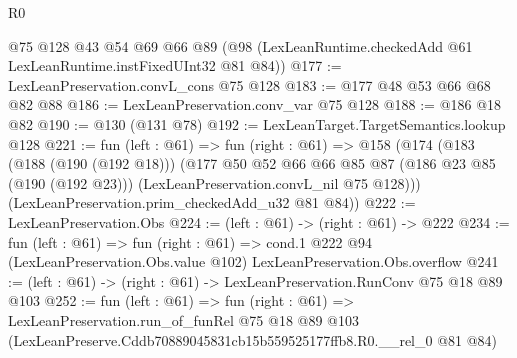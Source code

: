 \begin{lexlean}{R0}
\begin{coremodule}
    @75
    @128
    @43
    @54
    @69
    @66
    @89
    (@98 (LexLeanRuntime.checkedAdd @61 LexLeanRuntime.instFixedUInt32 @81 @84))
@177 := LexLeanPreservation.convL_cons @75 @128
@183 := @177 @48 @53 @66 @68 @82 @88
@186 := LexLeanPreservation.conv_var @75 @128
@188 := @186 @18 @82
@190 := @130 (@131 @78)
@192 := LexLeanTarget.TargetSemantics.lookup @128
@221 := fun (left : @61) =>
  fun (right : @61) =>
  @158
    (@174
      (@183
        (@188 (@190 (@192 @18)))
        (@177
          @50
          @52
          @66
          @66
          @85
          @87
          (@186 @23 @85 (@190 (@192 @23)))
          (LexLeanPreservation.convL_nil @75 @128)))
      (LexLeanPreservation.prim_checkedAdd_u32 @81 @84))
@222 := LexLeanPreservation.Obs
@224 := (left : @61) -> (right : @61) -> @222
@234 := fun (left : @61) =>
  fun (right : @61) =>
  cond.{1} @222 @94 (LexLeanPreservation.Obs.value @102) LexLeanPreservation.Obs.overflow
@241 := (left : @61) -> (right : @61) -> LexLeanPreservation.RunConv @75 @18 @89 @103
@252 := fun (left : @61) =>
  fun (right : @61) =>
  LexLeanPreservation.run_of_funRel
    @75
    @18
    @89
    @103
    (LexLeanPreserve.Cddb70889045831cb15b559525177ffb8.R0.__rel_0 @81 @84)
\end{coremodule}
\end{lexlean}
